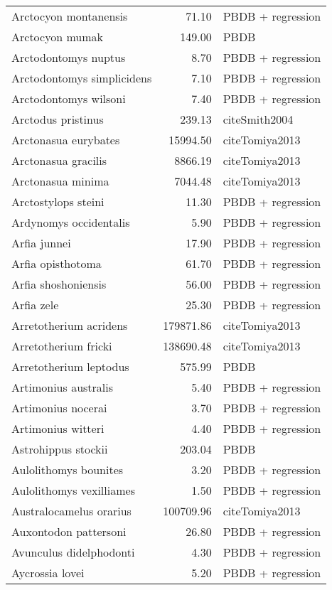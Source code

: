 \begin{table}[ht]
\begin{tabular}{lrl}
  Arctocyon montanensis & 71.10 & PBDB + regression \\ 
  Arctocyon mumak & 149.00 & PBDB \\ 
  Arctodontomys nuptus & 8.70 & PBDB + regression \\ 
  Arctodontomys simplicidens & 7.10 & PBDB + regression \\ 
  Arctodontomys wilsoni & 7.40 & PBDB + regression \\ 
  Arctodus pristinus & 239.13 & cite{Smith2004} \\ 
  Arctonasua eurybates & 15994.50 & cite{Tomiya2013} \\ 
  Arctonasua gracilis & 8866.19 & cite{Tomiya2013} \\ 
  Arctonasua minima & 7044.48 & cite{Tomiya2013} \\ 
  Arctostylops steini & 11.30 & PBDB + regression \\ 
  Ardynomys occidentalis & 5.90 & PBDB + regression \\ 
  Arfia junnei & 17.90 & PBDB + regression \\ 
  Arfia opisthotoma & 61.70 & PBDB + regression \\ 
  Arfia shoshoniensis & 56.00 & PBDB + regression \\ 
  Arfia zele & 25.30 & PBDB + regression \\ 
  Arretotherium acridens & 179871.86 & cite{Tomiya2013} \\ 
  Arretotherium fricki & 138690.48 & cite{Tomiya2013} \\ 
  Arretotherium leptodus & 575.99 & PBDB \\ 
  Artimonius australis & 5.40 & PBDB + regression \\ 
  Artimonius nocerai & 3.70 & PBDB + regression \\ 
  Artimonius witteri & 4.40 & PBDB + regression \\ 
  Astrohippus stockii & 203.04 & PBDB \\ 
  Aulolithomys bounites & 3.20 & PBDB + regression \\ 
  Aulolithomys vexilliames & 1.50 & PBDB + regression \\ 
  Australocamelus orarius & 100709.96 & cite{Tomiya2013} \\ 
  Auxontodon pattersoni & 26.80 & PBDB + regression \\ 
  Avunculus didelphodonti & 4.30 & PBDB + regression \\ 
  Aycrossia lovei & 5.20 & PBDB + regression \\ 

\end{tabular}
\end{table}
